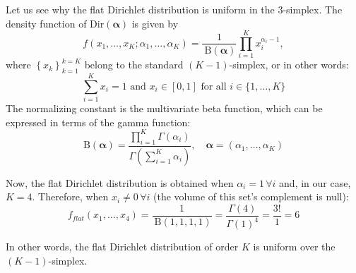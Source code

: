 \documentclass[a4paper,12pt]{article}
\begin{document}
\begin{itemize}
    Let us see why the flat Dirichlet distribution is uniform in the 3-simplex. The density function of Dir$(\boldsymbol{\alpha})$ is given by
    $$
    f\left(x_1, \ldots, x_K ; \alpha_1, \ldots, \alpha_K\right)=\frac{1}{\mathrm{~B}(\boldsymbol{\alpha})} \prod_{i=1}^K x_i^{\alpha_i-1},
    $$
    where $\left\{x_k\right\}_{k=1}^{k=K}$ belong to the standard $(K-1)$-simplex, or in other words:
    $$
    \sum_{i=1}^K x_i=1 \text { and } x_i \in[0,1] \text { for all } i \in\{1, \ldots, K\}
    $$
    The normalizing constant is the multivariate beta function, which can be expressed in terms of the gamma function:
    $$
    \mathrm{B}(\boldsymbol{\alpha})=\frac{\prod_{i=1}^K \Gamma\left(\alpha_i\right)}{\Gamma\left(\sum_{i=1}^K \alpha_i\right)}, \quad \boldsymbol{\alpha}=\left(\alpha_1, \ldots, \alpha_K\right)
    $$

    Now, the flat Dirichlet distribution is obtained when $\alpha_i=1 \, \forall i$ and, in our case, $K=4$. Therefore, when $x_i \neq 0 \, \forall i$ (the volume of this set's complement is null):
    $$
    f_{flat}\left(x_1, \ldots, x_4\right) = \frac{1}{\mathrm{~B}(1,1,1,1)} = \frac{\Gamma \left(4\right)}{\Gamma(1)^4} = \frac{3!}{1} = 6
    $$

    In other words, the flat Dirichlet distribution of order $K$ is uniform over the $(K-1)$-simplex.

\end{itemize}
\end{document}
